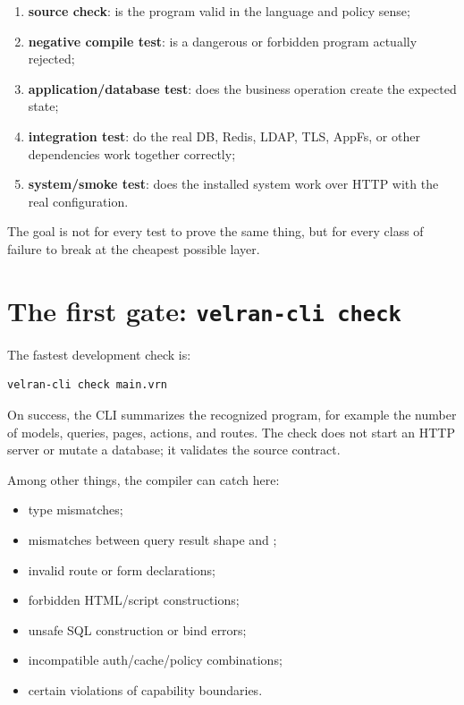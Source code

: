 \begin{enumerate}
  \item \textbf{source check}: is the program valid in the language and policy sense;
  \item \textbf{negative compile test}: is a dangerous or forbidden program actually rejected;
  \item \textbf{application/database test}: does the business operation create the expected state;
  \item \textbf{integration test}: do the real DB, Redis, LDAP, TLS, AppFs, or other dependencies work together correctly;
  \item \textbf{system/smoke test}: does the installed system work over HTTP with the real configuration.
\end{enumerate}

The goal is not for every test to prove the same thing, but for every class of failure to break at the cheapest possible layer.

\section{The first gate: \texttt{velran-cli check}}

The fastest development check is:

\begin{lstlisting}
velran-cli check main.vrn
\end{lstlisting}

On success, the CLI summarizes the recognized program, for example the number of models, queries, pages, actions, and routes. The check does not start an HTTP server or mutate a database; it validates the source contract.

Among other things, the compiler can catch here:

\begin{itemize}
  \item type mismatches;
  \item mismatches between query result shape and ;
  \item invalid route or form declarations;
  \item forbidden HTML/script constructions;
  \item unsafe SQL construction or bind errors;
  \item incompatible auth/cache/policy combinations;
  \item certain violations of capability boundaries.
\end{itemize}

